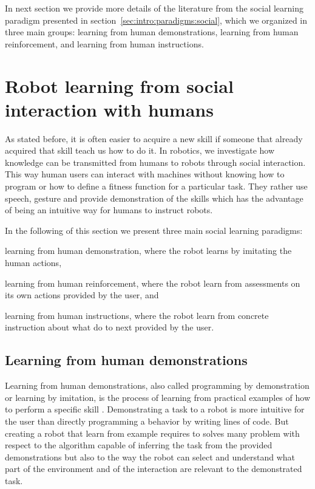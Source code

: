 In next section we provide more details of the literature from the social learning paradigm presented in section~\ref{sec:intro:paradigms:social}, which we organized in three main groups: learning from human demonstrations, learning from human reinforcement, and learning from human instructions.

\section{Robot learning from social interaction with humans}
\label{sec:intro:social}

As stated before, it is often easier to acquire a new skill if someone that already acquired that skill teach us how to do it. In robotics, we investigate how knowledge can be transmitted from humans to robots through social interaction. This way human users can interact with machines without knowing how to program or how to define a fitness function for a particular task. They rather use speech, gesture and provide demonstration of the skills which has the advantage of being an intuitive way for humans to instruct robots. 

In the following of this section we present three main social learning paradigms: \begin{inparaenum}[(a)] \item learning from human demonstration, where the robot learns by imitating the human actions, \item learning from human reinforcement, where the robot learn from assessments on its own actions provided by the user, and \item learning from human instructions, where the robot learn from concrete instruction about what do to next provided by the user. \end{inparaenum}

\subsection{Learning from human demonstrations}

Learning from human demonstrations, also called programming by demonstration or learning by imitation, is the process of learning from practical examples of how to perform a specific skill \cite{schaal1999imitation,argall09survey,lopes10imitationchapter}. Demonstrating a task to a robot is more intuitive for the user than directly programming a behavior by writing lines of code. But creating a robot that learn from example requires to solves many problem with respect to the algorithm capable of inferring the task from the provided demonstrations but also to the way the robot can select and understand what part of the environment and of the interaction are relevant to the demonstrated task.


